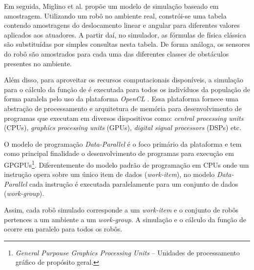 Em seguida, Miglino et al. \cite{miglino1996evolving} propõe um modelo de simulação baseado em amostragem. Utilizando um robô no ambiente real, constrói-se uma tabela contendo amostragens do deslocamento linear e angular para diferentes valores aplicados aos atuadores. A partir daí, no simulador, as fórmulas de física clássica são substituídas por simples consultas nesta tabela. De forma análoga, os sensores do robô são amostrados para cada uma das diferentes classes de obstáculos presentes no ambiente.

Além disso, para aproveitar os recursos computacionais disponíveis, a simulação para o cálculo da função de \fitness é executada para todos os indivíduos da população de forma paralela pelo uso da plataforma \textit{OpenCL} \cite{amd2012amdaccelerated}. Essa plataforma fornece uma abstração de processamento e arquitetura de memória para desenvolvimento de programas que executam em diversos dispositivos como: \textit{central processing units} (CPUs), \textit{graphics processing units} (GPUs), \textit{digital signal processors} (DSPs) etc.

O modelo de programação \textit{Data-Parallel} é o foco primário da plataforma e tem como principal finalidade o desenvolvimento de programas para execução em GPGPUs\footnote{\textit{General Purpouse Graphics Processing Units} -- Unidades de processamento gráfico de propósito geral.}. Diferentemente do modelo padrão de programação em CPUs onde um instrução opera sobre um único item de dados (\textit{work-item}), no modelo \textit{Data-Parallel} cada instrução é executada paralelamente para um conjunto de dados (\textit{work-group}).

Assim, cada robô simulado corresponde a um \textit{work-item} e o conjunto de robôs pertences a um ambiente a um \textit{work-group}. A simulação e o cálculo da função de \fitness ocorre em paralelo para todos os robôs.